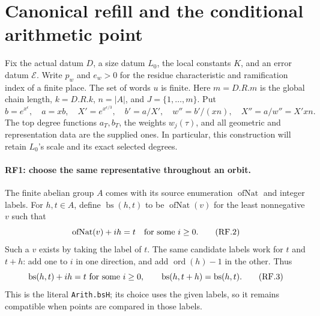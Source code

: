 \section{Canonical refill and the conditional arithmetic point}
\label{sec:canonical-refill}


Fix the actual datum $D$, a size datum $L_0$, the local constants $K$,
and an error datum $\mathcal E$. Write $p_w$ and $e_w>0$ for the residue
characteristic and ramification index of a finite place. The set of words
$u$ is finite. Here $m=D.R.m$ is the global chain length, $k=D.R.k$,
$n=|A|$, and $J=\{1,\ldots,m\}$. Put
\[
 b=e^{x^\epsilon},\quad a=xb,\quad X'=e^{x^{\epsilon/3}},\quad
 b'=a/X',\quad w''=b'/(xn),\quad X''=a/w''=X'xn.       \tag{RF.1}
\]
The top degree functions $a_T,b_T$, the weights $w_j(\tau)$, and all
geometric and representation data are the supplied ones. In particular,
this construction will retain $L_0$'s scale and its exact selected degrees.

\paragraph{RF1: choose the same representative throughout an orbit.}
The finite abelian group $A$ comes with its source enumeration
$\operatorname{ofNat}$ and integer labels. For $h,t\in A$, define
$\operatorname{bs}(h,t)$ to be $\operatorname{ofNat}(v)$ for the least
nonnegative $v$ such that
\[
                  \operatorname{ofNat}(v)+ih=t
                  \quad\hbox{for some }i\geq0.                 \tag{RF.2}
\]
Such a $v$ exists by taking the label of $t$. The same candidate labels
work for $t$ and $t+h$: add one to $i$ in one direction, and add
$\operatorname{ord}(h)-1$ in the other. Thus
\[
 \operatorname{bs}(h,t)+ih=t\ \hbox{for some }i\geq0,
 \qquad\operatorname{bs}(h,t+h)=\operatorname{bs}(h,t).          \tag{RF.3}
\]
This is the literal \texttt{Arith.bsH}; its choice uses the given labels,
so it remains compatible when points are compared in those labels.

